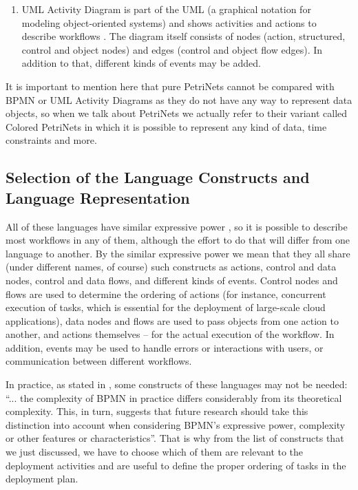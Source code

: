 \begin{enumerate}
\item  UML Activity Diagram is part of the UML (a graphical notation for modeling object-oriented systems) and shows activities and actions to describe workflows   \cite{JOT:issue_2003_07/column3}. The diagram itself consists of nodes (action, structured, control and object nodes) and edges (control and object flow edges). In addition to that, different kinds of events may be added. 
\end{enumerate}

\noindent 

\noindent It is important to mention here that pure PetriNets cannot be compared with BPMN or UML Activity Diagrams as they do not have any way to represent data objects, so when we talk about PetriNets we actually refer to their variant called Colored PetriNets \cite{jensen1991coloured} in which it is possible to represent any kind of data, time constraints and more.

\subsection{Selection of the Language Constructs and Language Representation}

\noindent All of these languages have similar expressive power \cite{geambacsu2012bpmn, storrle2004semantics, hinz2005transforming}, so it is possible to describe most workflows in any of them, although the effort to do that will differ from one language to another. By the similar expressive power we mean that they all share (under different names, of course) such constructs as actions, control and data nodes, control and data flows, and different kinds of events. Control nodes and flows are used to determine the ordering of actions (for instance, concurrent execution of tasks, which is essential for the deployment of large-scale cloud applications), data nodes and flows are used to pass objects from one action to another, and actions themselves -- for the actual execution of the workflow. In addition, events may be used to handle errors or interactions with users, or communication between different workflows. 

\noindent 

\noindent In practice, as stated in \cite{zur2008much}, some constructs of these languages may not be needed: ``... the complexity of BPMN in practice differs considerably from its theoretical complexity. This, in turn, suggests that future research should take this distinction into account when considering BPMN's expressive power, complexity or other features or characteristics''. That is why from the list of constructs that we just discussed, we have to choose which of them are relevant to the deployment activities and are useful to define the proper ordering of tasks in the deployment plan.

